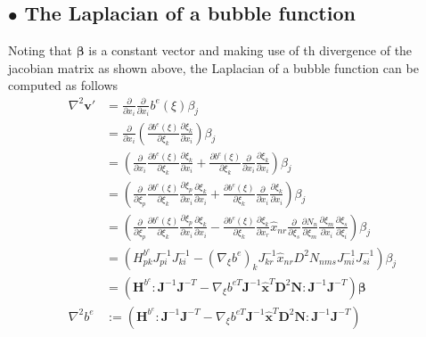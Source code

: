 \documentclass[11pt]{amsart}
\begin{document}
\subsection*{$\bullet$ The Laplacian of a bubble function}
Noting that $\boldsymbol{\beta}$ is a constant vector and making use of th divergence of the jacobian matrix as shown above, the Laplacian of a bubble function can be computed as follows
\begin{align*}
\nabla^2 \boldsymbol{v}'  & =   \frac{\partial}{\partial x_i} \frac{\partial }{\partial x_i} b^e(\xi)\beta_j   \\
  & =   \frac{\partial}{\partial x_i} \left( \frac{\partial b^e(\xi)}{\partial \xi_k} \frac{\partial \xi_k}{\partial x_i} \right) \beta_j  \\
  & =   \left( \frac{\partial}{\partial x_i} \frac{\partial b^e(\xi)}{\partial \xi_k} \frac{\partial \xi_k}{\partial x_i} + \frac{\partial b^e(\xi)}{\partial \xi_k} \frac{\partial}{\partial x_i} \frac{\partial \xi_k}{\partial x_i} \right) \beta_j  \\
  & =   \left( \frac{\partial}{\partial \xi_p}\frac{\partial b^e(\xi)}{\partial \xi_k}\frac{\partial \xi_p}{\partial x_i}\frac{\partial \xi_k}{\partial x_i} + \frac{\partial b^e(\xi)}{\partial \xi_k} \frac{\partial}{\partial x_i} \frac{\partial \xi_k}{\partial x_i}\right)\beta_j   \\
  & =   \left( \frac{\partial}{\partial \xi_p}\frac{\partial b^e(\xi)}{\partial \xi_k}\frac{\partial \xi_p}{\partial x_i}\frac{\partial \xi_k}{\partial x_i} - \frac{\partial b^e(\xi)}{\partial \xi_k}\frac{\partial \xi_k}{\partial x_r}\hat{x}_{nr}\frac{\partial}{\partial \xi_s}\frac{\partial N_n}{\partial \xi_m}\frac{\partial \xi_m}{\partial x_i}\frac{\partial \xi_s}{\partial \xi_i} \right) \beta_j  \\
  & =   \left( H^{b^e}_{pk} J^{-1}_{pi} J^{-1}_{ki} - (\nabla_{\xi} b^e)_{k} J^{-1}_{kr} \hat{x}_{nr} D^2N_{nms} J^{-1}_{mi} J^{-1}_{si} \right) \beta_j  \\
  & =   \left( \boldsymbol{H}^{b^e} : \boldsymbol{J}^{-1} \boldsymbol{J}^{-T} - \nabla_{\xi} b^{eT} \boldsymbol{J}^{-1} \hat{\boldsymbol{x}}^T \boldsymbol{D}^2\boldsymbol{N}: \boldsymbol{J}^{-1} \boldsymbol{J}^{-T} \right)  \boldsymbol{\beta}  \\
  \nabla^2 b^e &:=  \left( \boldsymbol{H}^{b^e} : \boldsymbol{J}^{-1} \boldsymbol{J}^{-T} - \nabla_{\xi} b^{eT} \boldsymbol{J}^{-1} \hat{\boldsymbol{x}}^T \boldsymbol{D}^2\boldsymbol{N} : \boldsymbol{J}^{-1} \boldsymbol{J}^{-T} \right) 
\end{align*}
\end{document}
